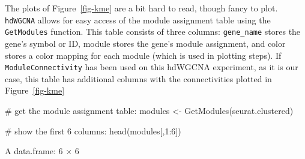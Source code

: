 \documentclass[
  letterpaper,
  DIV=11,
  numbers=noendperiod]{scrartcl}
\newenvironment{Shaded}{\begin{snugshade}}{\end{snugshade}}
\newcommand{\CommentTok}[1]{\textcolor[rgb]{0.37,0.37,0.37}{#1}}
\newcommand{\DecValTok}[1]{\textcolor[rgb]{0.68,0.00,0.00}{#1}}
\newcommand{\FunctionTok}[1]{\textcolor[rgb]{0.28,0.35,0.67}{#1}}
\newcommand{\NormalTok}[1]{\textcolor[rgb]{0.00,0.23,0.31}{#1}}
\newcommand{\OtherTok}[1]{\textcolor[rgb]{0.00,0.23,0.31}{#1}}
\newcommand{\SpecialCharTok}[1]{\textcolor[rgb]{0.37,0.37,0.37}{#1}}
\begin{document}
The plots of Figure~\ref{fig-kme} are a bit hard to read, though fancy
to plot. \texttt{hdWGCNA} allows for easy access of the module
assignment table using the \texttt{GetModules} function. This table
consists of three columns: \texttt{gene\_name} stores the gene's symbol
or ID, module stores the gene's module assignment, and color stores a
color mapping for each module (which is used in plotting steps). If
\texttt{ModuleConnectivity} has been used on this hdWGCNA experiment, as
it is our case, this table has additional columns with the
connectivities plotted in Figure~\ref{fig-kme}

\begin{Shaded}
\begin{Highlighting}[]
\CommentTok{\# get the module assignment table:}
\NormalTok{modules }\OtherTok{\textless{}{-}} \FunctionTok{GetModules}\NormalTok{(seurat.clustered)}

\CommentTok{\# show the first 6 columns:}
\FunctionTok{head}\NormalTok{(modules[,}\DecValTok{1}\SpecialCharTok{:}\DecValTok{6}\NormalTok{])}
\end{Highlighting}
\end{Shaded}

A data.frame: 6 × 6
\end{document}
